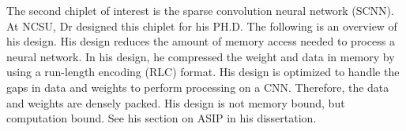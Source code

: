 \documentclass[../main.tex]{subfiles}
\begin{document}
The second chiplet of interest is the sparse convolution neural network (SCNN). At NCSU, Dr designed this chiplet for his PH.D. The following is an overview of his design. His design reduces the amount of memory access needed to process a neural network. In his design, he compressed the weight and data in memory by using a run-length encoding (RLC) format. His design is optimized to handle the gaps in data and weights to perform processing on a CNN. Therefore, the data and weights are densely packed. His design is not memory bound, but computation bound. See his section on ASIP in his dissertation\cite{LeWeifuDissertation}.
\end{document}
